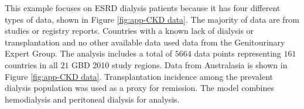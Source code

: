 This example focuses on ESRD dialysis patients because it has four
different types of data, shown in Figure \ref{fig:app-CKD data}.  The
majority of data are from studies or registry reports.  Countries with
a known lack of dialysis or transplantation and no other available data
used data from the Genitourinary Expert Group.  The analysis
includes a total of $5664$ data points representing $161$ countries in
all $21$ GBD 2010 study regions.  Data from Australasia is shown in
Figure \ref{fig:app-CKD data}.
Transplantation incidence among the prevalent
dialysis population was used as a proxy for remission.  The model
combines hemodialysis and peritoneal dialysis for analysis.

